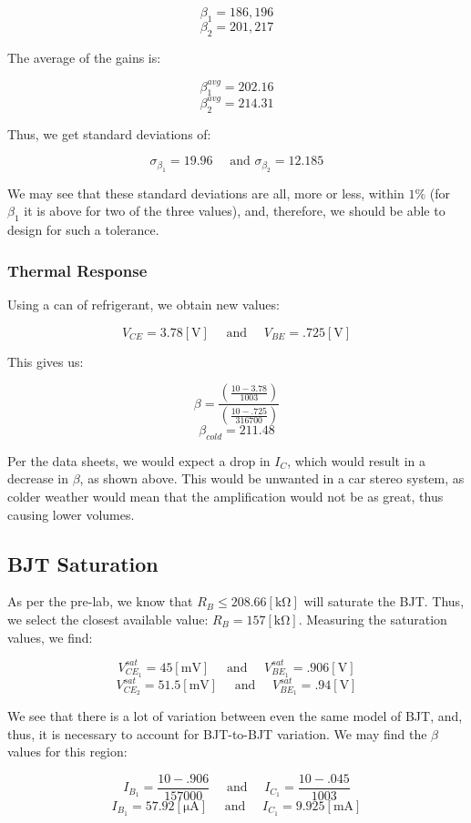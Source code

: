 \documentclass[
	letterpaper, %
	10pt, %
]{CSUniSchoolLabReport}
\begin{document}
$$\beta_1=186,196$$
$$\beta_2=201,217$$

The average of the gains is:

$$\beta_1^{avg}=202.16$$
$$\beta_2^{avg}=214.31$$

Thus, we get standard deviations of:

$$\boxed{\sigma_{\beta_1}=19.96\quad\text{ and }\sigma_{\beta_2}=12.185}$$

We may see that these standard deviations are all, more or less, within $1\%$ (for $\beta_1$ it is above for two of the three values), and, therefore, we should be able to design for such a tolerance.

\subsubsection{Thermal Response}

Using a can of refrigerant, we obtain new values:

$$V_{CE}=3.78[\si{\volt}]\quad\text{ and }\quad V_{BE}=.725[\si{\volt}]$$

This gives us:

$$\beta=\frac{\left( \frac{10-3.78}{1003} \right)}{\left( \frac{10-.725}{316700} \right)}$$
$$\boxed{\beta_{cold}=211.48}$$

Per the data sheets, we would expect a drop in $I_C$, which would result in a decrease in $\beta$, as shown above. This would be unwanted in a car stereo system, as colder weather would mean that the amplification would not be as great, thus causing lower volumes.

\subsection{BJT Saturation}

As per the pre-lab, we know that $R_B\leq 208.66[\si{\kilo\ohm}]$ will saturate the BJT. Thus, we select the closest available value: $R_B=157[\si{\kilo\ohm}]$. Measuring the saturation values, we find:

$$V_{CE_1}^{sat}=45[\si{\milli\volt}]\quad\text{ and }\quad V_{BE_1}^{sat}=.906[\si{\volt}]$$
$$V_{CE_2}^{sat}=51.5[\si{\milli\volt}]\quad\text{ and }\quad V_{BE_1}^{sat}=.94[\si{\volt}]$$

We see that there is a lot of variation between even the same model of BJT, and, thus, it is necessary to account for BJT-to-BJT variation. We may find the $\beta$ values for this region:

$$I_{B_1}=\frac{10-.906}{157000}\quad\text{ and }\quad I_{C_1}=\frac{10-.045}{1003}$$
$$\boxed{I_{B_1}=57.92[\si{\micro\ampere}]\quad\text{ and }\quad I_{C_1}=9.925[\si{\milli\ampere}]}$$
\end{document}
